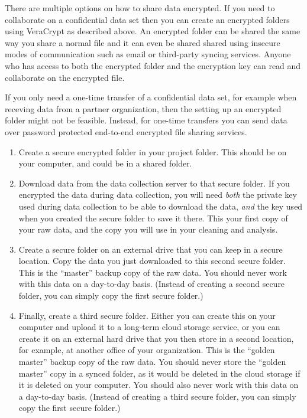 There are multiple options on how to share data encrypted. 
If you need to collaborate on a confidential data set 
then you can create an encrypted folders using VeraCrypt as described above.
An encrypted folder can be shared the same way you share a normal file
and it can even be shared shared using insecure modes of communication
such as email or third-party syncing services.
Anyone who has access to both the encrypted folder and the encryption key
can read and collaborate on the encrypted file.

If you only need a one-time transfer of a confidential data set, 
for example when receving data from a partner organization,
then the setting up an encrypted folder might not be feasible.
Instead, for one-time transfers you can send data over password protected end-to-end encrypted file sharing services. 




\begin{enumerate}
	\item Create a secure encrypted folder in your project folder.
  This should be on your computer, and could be in a shared folder.
  
	\item Download data from the data collection server to that secure folder.
	If you encrypted the data during data collection, you will need \textit{both} the
	private key used during data collection to be able to download the data,
	\textit{and} the key used when you created the secure folder to save it there.
	This your first copy of your raw data, and the copy you will use in your cleaning and analysis.
	
	\item Create a secure folder on an external drive that you can keep in a secure location.
	Copy the data you just downloaded to this second secure	folder.
	This is the ``master'' backup copy of the raw data. 
	You should never work with this data on a day-to-day basis.
	(Instead of creating a second secure folder, you can simply copy the first secure folder.)
	
	\item Finally, create a third secure folder.
	Either you can create this on your computer and upload it to a long-term cloud storage service,
	or you can create it on	an external hard drive that you then store in a second location,
	for example, at another office of your organization.
	This is the ``golden master'' backup copy of the raw data.
	You should never store the ``golden master'' copy in a synced folder, 
	as it would be deleted in the cloud storage if it is deleted on your computer.
	You should also never work with this data on a day-to-day basis.
	(Instead of creating a third secure folder, you can simply copy the first secure folder.)
\end{enumerate}

